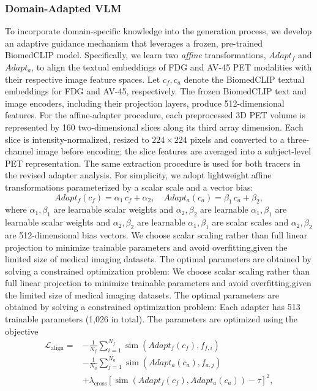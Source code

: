 \documentclass{article}
\providecommand{\DIFaddtex}[1]{{\protect\color{blue} \sf #1}} %
\providecommand{\DIFdeltex}[1]{{\protect\color{red} \ifmmode #1\else\scriptsize #1\fi}} %
\providecommand{\DIFaddbegin}{} %
\providecommand{\DIFaddend}{} %
\providecommand{\DIFdelbegin}{} %
\providecommand{\DIFdelend}{} %
\providecommand{\DIFadd}[1]{\texorpdfstring{\DIFaddtex{#1}}{#1}} %
\providecommand{\DIFdel}[1]{\texorpdfstring{\DIFdeltex{#1}}{}} %
\newcommand{\DIFscaledelfig}{0.5}
\newlength{\DIFdelgraphicswidth} %
\newlength{\DIFdelgraphicsheight} %
\newcommand{\DIFaddincludegraphics}[2][]{{\color{blue}\fbox{\DIFOincludegraphics[#1]{#2}}}} %
\newcommand{\DIFdelincludegraphics}[2][]{%
\sbox{\DIFdelgraphicsbox}{\DIFOincludegraphics[#1]{#2}}%
\settoboxwidth{\DIFdelgraphicswidth}{\DIFdelgraphicsbox} %
\settoboxtotalheight{\DIFdelgraphicsheight}{\DIFdelgraphicsbox} %
\scalebox{\DIFscaledelfig}{%
\parbox[b]{\DIFdelgraphicswidth}{\usebox{\DIFdelgraphicsbox}\\[-\baselineskip] \rule{\DIFdelgraphicswidth}{0em}}\llap{\resizebox{\DIFdelgraphicswidth}{\DIFdelgraphicsheight}{%
\setlength{\unitlength}{\DIFdelgraphicswidth}%
\begin{picture}(1,1)%
\thicklines\linethickness{2pt} %
{\color[rgb]{1,0,0}\put(0,0){\framebox(1,1){}}}%
{\color[rgb]{1,0,0}\put(0,0){\line( 1,1){1}}}%
{\color[rgb]{1,0,0}\put(0,1){\line(1,-1){1}}}%
\end{picture}%
}\hspace*{3pt}}} %
} %
\DeclareRobustCommand{\DIFaddbegin}{\DIFOaddbegin \let\includegraphics\DIFaddincludegraphics} %
\DeclareRobustCommand{\DIFaddend}{\DIFOaddend \let\includegraphics\DIFOincludegraphics} %
\DeclareRobustCommand{\DIFdelbegin}{\DIFOdelbegin \let\includegraphics\DIFdelincludegraphics} %
\DeclareRobustCommand{\DIFdelend}{\DIFOaddend \let\includegraphics\DIFOincludegraphics} %
\begin{document}
\subsubsection{Domain-Adapted VLM}
To incorporate domain-specific knowledge into the generation process, we develop an adaptive guidance mechanism that leverages a frozen, pre-trained BiomedCLIP model. Specifically, we learn two \textit{affine} transformations, $Adapt_f$ and $Adapt_a$, to align the textual embeddings of FDG and AV-45 PET modalities with their respective image feature spaces. Let $c_f, c_a$ denote the BiomedCLIP textual embeddings for FDG and AV-45, respectively. \DIFaddbegin \DIFadd{The frozen BiomedCLIP text and image encoders, including their projection layers, produce 512-dimensional features. For the affine-adapter procedure, each preprocessed 3D PET volume is represented by 160 two-dimensional slices along its third array dimension. Each slice is intensity-normalized, resized to $224\times224$ pixels and converted to a three-channel image before encoding; the slice features are averaged into a subject-level PET representation. The same extraction procedure is used for both tracers in the revised adapter analysis.
}\DIFaddend For simplicity, we adopt lightweight affine transformations parameterized by a scalar scale and a vector bias:
\[
Adapt_f(c_f) = \alpha_1 \, c_f + \alpha_2, \quad
Adapt_a(c_a) = \beta_1 \, c_a + \beta_2,
\]
where \DIFdelbegin \DIFdel{$\alpha_1, \beta_1 $ are learnable scalar weights and $\alpha_2, \beta_2 $ are learnable }\DIFdelend \DIFaddbegin \DIFadd{$\alpha_1,\beta_1$ are scalar scales and $\alpha_2,\beta_2$ are 512-dimensional }\DIFaddend bias vectors. \DIFdelbegin \DIFdel{We choose scalar scaling rather than full linear projection to minimize trainable parameters and avoid overfitting,given the limited size of medical imaging datasets. The optimal parameters are obtained by solving a constrained optimization problem:
}\DIFdelend \DIFaddbegin \DIFadd{Each adapter has 513 trainable parameters (1,026 in total). The parameters are optimized using the objective
}\DIFaddend \begin{equation}
\DIFdelbegin %
\DIFdelend \DIFaddbegin \begin{aligned}
\mathcal{L}_{\mathrm{align}}={}&-\frac{1}{N_f}\sum_{i=1}^{N_f}\operatorname{sim}(Adapt_f(c_f),f_{f,i})\\
&-\frac{1}{N_a}\sum_{j=1}^{N_a}\operatorname{sim}(Adapt_a(c_a),f_{a,j})\\
&+\lambda_{\mathrm{cross}}\left[\operatorname{sim}(Adapt_f(c_f),Adapt_a(c_a))-\tau\right]^2,
\end{aligned}\DIFaddend 
\label{eq:align_opt}
\end{equation}
\end{document}
